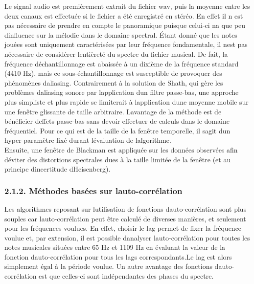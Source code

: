 \documentclass[letterpaper]{article}
\begin{document}
Le signal audio est premièrement extrait du fichier wav, puis la moyenne entre les 
deux canaux est effectuée si le fichier a été enregistré en stéréo. En effet il n\textquotesingle
est pas nécessaire de prendre en compte le panoramique puisque celui-ci n\textquotesingle a que 
peu d\textquotesingle influence sur la mélodie dans le domaine spectral. 
Étant donné que les notes jouées sont uniquement caractérisées par leur fréquence fondamentale,
il n\textquotesingle est pas nécessaire de considérer l\textquotesingle entièreté du spectre
du fichier musical. De fait, la fréquence d\textquotesingle échantillonnage est abaissée à un dixième 
de la fréquence standard (4410 Hz), mais ce sous-échantillonnage est susceptible de provoquer des
phénomènes d\textquotesingle aliasing. Contrairement à la solution de Sh\textquotesingle ath, 
qui gère les problèmes d\textquotesingle aliasing sonore par l\textquotesingle application 
d\textquotesingle un filtre passe-bas, une approche plus simpliste et plus rapide se limiterait à
l\textquotesingle application d\textquotesingle une moyenne mobile sur une fenêtre glissante
de taille arbitraire. L\textquotesingle avantage de la méthode est de bénéficier d\textquotesingle effets
passe-bas sans devoir effectuer de calculs dans le domaine fréquentiel. Pour ce qui est de la taille
de la fenêtre temporelle, il s\textquotesingle agit d\textquotesingle un hyper-paramètre fixé durant
l\textquotesingle évaluation de l\textquotesingle algorithme. \citep{IS}\\

Ensuite, une fenêtre de Blackman est appliquée sur les données observées afin d\textquotesingle éviter des distortions spectrales
dues à la taille limitée de la fenêtre (et au principe d\textquotesingle incertitude d\textquotesingle Heisenberg).

\subsubsection*{2.1.2. Méthodes basées sur l\textquotesingle auto-corrélation}

Les algorithmes reposant sur l\textquotesingle utilisation de fonctions d\textquotesingle auto-corrélation sont plus souples
car l\textquotesingle auto-corrélation peut être calculé de diverses manières, et seulement pour les fréquences voulues.
En effet, choisir le lag permet de fixer la fréquence voulue et, par extension, il est possible d\textquotesingle analyser
l\textquotesingle auto-corrélation pour toutes les notes musicales situées entre 65 Hz et 1109 Hz en évaluant la valeur
de la fonction d\textquotesingle auto-corrélation pour tous les lags correspondants.Le lag est alors simplement égal à la période
voulue. Un autre avantage des fonctions d\textquotesingle auto-corrélation est que celles-ci sont indépendantes des phases du spectre.
\end{document}
